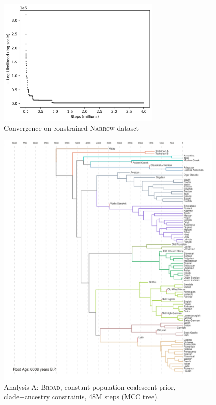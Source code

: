 \documentclass[10pt,journal,compsoc]{IEEEtran}
\begin{document}
\begin{figure}
\caption{Convergence on constrained \textsc{Narrow} dataset}\label{fig:convergence}
\includegraphics[width=8cm,center]{convergence}
\end{figure}

\begin{figure}
    \caption{Analysis A: \textsc{Broad}, constant-population coalescent prior, clade+ancestry constraints, 48M steps (MCC tree).}\label{fig:analysisA}
    \includegraphics[width=\textwidth, center]{runs24-broad-constant}
\end{figure}
\end{document}
